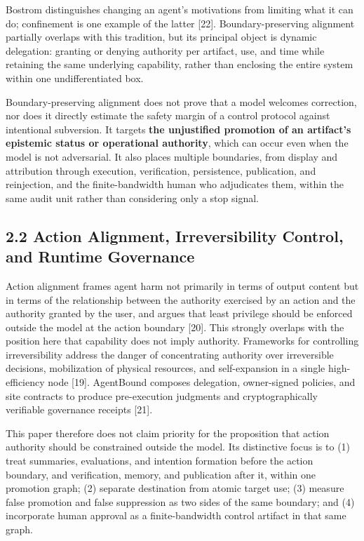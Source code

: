 Bostrom distinguishes changing an agent's motivations from limiting what it can do; confinement is one example of the latter {[}22{]}. Boundary-preserving alignment partially overlaps with this tradition, but its principal object is dynamic delegation: granting or denying authority per artifact, use, and time while retaining the same underlying capability, rather than enclosing the entire system within one undifferentiated box.

Boundary-preserving alignment does not prove that a model welcomes correction, nor does it directly estimate the safety margin of a control protocol against intentional subversion. It targets \textbf{the unjustified promotion of an artifact's epistemic status or operational authority}, which can occur even when the model is not adversarial. It also places multiple boundaries, from display and attribution through execution, verification, persistence, publication, and reinjection, and the finite-bandwidth human who adjudicates them, within the same audit unit rather than considering only a stop signal.

\subsection{2.2 Action Alignment, Irreversibility Control, and Runtime Governance}\label{action-alignment-irreversibility-control-and-runtime-governance}

Action alignment frames agent harm not primarily in terms of output content but in terms of the relationship between the authority exercised by an action and the authority granted by the user, and argues that least privilege should be enforced outside the model at the action boundary {[}20{]}. This strongly overlaps with the position here that capability does not imply authority. Frameworks for controlling irreversibility address the danger of concentrating authority over irreversible decisions, mobilization of physical resources, and self-expansion in a single high-efficiency node {[}19{]}. AgentBound composes delegation, owner-signed policies, and site contracts to produce pre-execution judgments and cryptographically verifiable governance receipts {[}21{]}.

This paper therefore does not claim priority for the proposition that action authority should be constrained outside the model. Its distinctive focus is to (1) treat summaries, evaluations, and intention formation before the action boundary, and verification, memory, and publication after it, within one promotion graph; (2) separate destination from atomic target use; (3) measure false promotion and false suppression as two sides of the same boundary; and (4) incorporate human approval as a finite-bandwidth control artifact in that same graph.

